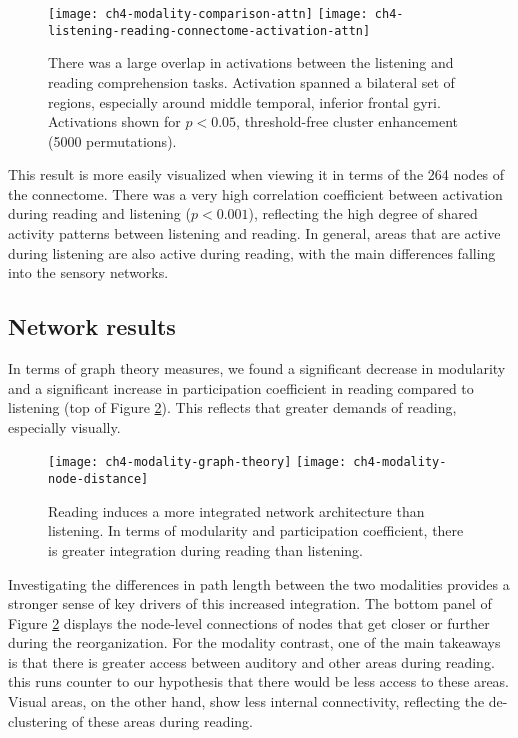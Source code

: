 \begin{figure}[t!]
	\centering
	\texttt{[image: ch4-modality-comparison-attn]}
	\texttt{[image: ch4-listening-reading-connectome-activation-attn]}
    \caption[Large overlap between listening and reading activation.]{There was a large overlap in activations between the listening and reading comprehension tasks. Activation spanned a bilateral set of regions, especially around middle temporal, inferior frontal gyri. Activations shown for $p < 0.05$, threshold-free cluster enhancement (5000 permutations).}
	\label{fig:ch4-modality-comparison-attn}
\end{figure}

This result is more easily visualized when viewing it in terms of the 264 nodes of the connectome. There was a very high correlation coefficient between activation during reading and listening ($p < 0.001$), reflecting the high degree of shared activity patterns between listening and reading. In general, areas that are active during listening are also active during reading, with the main differences falling into the sensory networks. 

\subsection{Network results}

In terms of graph theory measures, we found a significant decrease in modularity and a significant increase in participation coefficient in reading compared to listening (top of Figure  \ref{fig:ch4-modality-graph-theory}). This reflects that greater demands of reading, especially visually. 
\begin{figure}[t!]
	\centering
	\texttt{[image: ch4-modality-graph-theory]}
	\texttt{[image: ch4-modality-node-distance]}
    \caption[Reading induces a more integrated network architecture than listening.]{Reading induces a more integrated network architecture than listening. In terms of modularity and participation coefficient, there is greater integration during reading than listening. }
	\label{fig:ch4-modality-graph-theory}
\end{figure}

Investigating the differences in path length between the two modalities provides a stronger sense of key drivers of this increased integration. The bottom panel of Figure \ref{fig:ch4-modality-graph-theory} displays the node-level connections of nodes that get closer or further during the reorganization. For the modality contrast, one of the main takeaways is that there is greater access between auditory and other areas during reading. this runs counter to our hypothesis that there would be less access to these areas. Visual areas, on the other hand, show less internal connectivity, reflecting the de-clustering of these areas during reading. 

